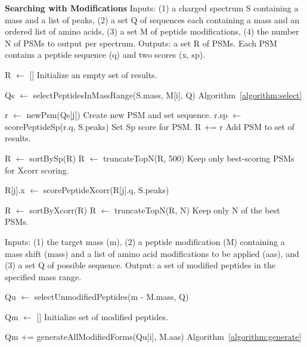 \documentclass[12pt]{article}
\begin{document}
\begin{algorithm}
\caption{{\bf Searching with Modifications} Inputs: (1) a charged
  spectrum S containing a mass and a list of peaks, (2) a set Q of
  sequences each containing a mass and an ordered list of amino acids,
  (3) a set M of peptide modifications, (4) the number N of PSMs to
  output per spectrum. Outputs: a set R of PSMs.  Each PSM contains a
  peptide sequence (q) and two scores (x, sp).
  \label{algorithm:search}}

\begin{algorithmic}[1]

\State R $\gets$ []
\Comment Initialize an empty set of results.

   \State Qs $\gets$ selectPeptidesInMassRange(S.mass, M[i], Q)
   \Comment Algorithm~\ref{algorithm:select}
   
     \State r $\gets$ newPsm(Qs[j])
     \Comment Create new PSM and set sequence.
     \State r.sp $\gets$ scorePeptideSp(r.q, S.peaks)
     \Comment Set Sp score for PSM.
     \State R += r
     \Comment Add PSM to set of results.
   \EndFor

   \State R $\gets$ sortBySp(R)
   \State R $\gets$ truncateTopN(R, 500)
   \Comment Keep only best-scoring PSMs for Xcorr scoring.

     \State R[j].x $\gets$ scorePeptideXcorr(R[j].q, S.peaks)
   \EndFor

   \State R $\gets$ sortByXcorr(R)
   \State R $\gets$ truncateTopN(R, N)
   \Comment Keep only N of the best PSMs.

\EndFor

\State {}
\EndProcedure
\end{algorithmic}
\end{algorithm}

\begin{algorithm}
\caption{ Inputs: (1) the target mass (m), (2) a peptide modification (M)
  containing a mass shift (mass) and a list of amino acid
  modifications to be applied (aas), and (3) a set Q of possible sequence.
  Output: a set of modified peptides in the specified mass range.
  \label{algorithm:select}}

\begin{algorithmic}[1]
  \State Qu $\gets$ selectUnmodifiedPeptides(m - M.mass, Q)
   
  \State Qm $\gets$ []
  \Comment Initialize set of modified peptides.

      \State Qm += generateAllModifiedForms(Qu[i], M.aas)
      \Comment Algorithm~\ref{algorithm:generate}
    \EndIf
  \EndFor

  \State {}
\EndProcedure
\end{algorithmic}
\end{algorithm}
\end{document}
